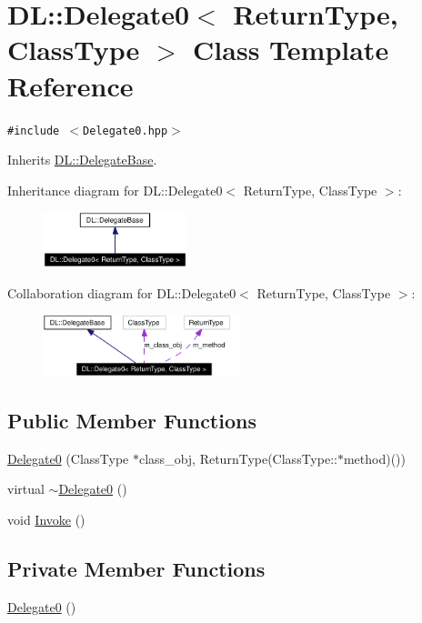 \hypertarget{classDL_1_1Delegate0}{
\section{DL::Delegate0$<$ Return\-Type, Class\-Type $>$ Class Template Reference}
\label{classDL_1_1Delegate0}
}
{\tt \#include $<$Delegate0.hpp$>$}

Inherits \hyperlink{classDL_1_1DelegateBase}{DL::Delegate\-Base}.

Inheritance diagram for DL::Delegate0$<$ Return\-Type, Class\-Type $>$:\begin{figure}[H]
\begin{center}
\leavevmode
\includegraphics[width=118pt]{classDL_1_1Delegate0__inherit__graph}
\end{center}
\end{figure}
Collaboration diagram for DL::Delegate0$<$ Return\-Type, Class\-Type $>$:\begin{figure}[H]
\begin{center}
\leavevmode
\includegraphics[width=162pt]{classDL_1_1Delegate0__coll__graph}
\end{center}
\end{figure}
\subsection*{Public Member Functions}
\begin{CompactItemize}
\item 
\hyperlink{classDL_1_1Delegate0_a0}{Delegate0} (Class\-Type $\ast$class\_\-obj, Return\-Type(Class\-Type::$\ast$method)())
\item 
virtual \hyperlink{classDL_1_1Delegate0_a1}{$\sim$Delegate0} ()
\item 
void \hyperlink{classDL_1_1Delegate0_a2}{Invoke} ()
\end{CompactItemize}
\subsection*{Private Member Functions}
\begin{CompactItemize}
\item 
\hyperlink{classDL_1_1Delegate0_d0}{Delegate0} ()
\end{CompactItemize}
